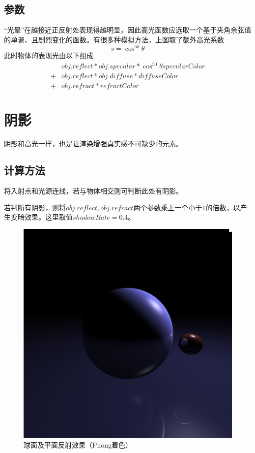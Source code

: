 \documentclass[10pt,twocolumn]{article}
\begin{document}
\subsection{\hei 参数}
“光晕”在越接近正反射处表现得越明显，因此高光函数应选取一个基于夹角余弦值的单调、且剧烈变化的函数。有很多种模拟方法，上图取了额外高光系数
\begin{equation}
s=\cos^{50}{\theta}
\end{equation}
此时物体的表现光由以下组成
\begin{align*}
 &obj.reflect * obj.specular *\cos^{50}{\theta}specularColor\\
 +&obj.reflect * obj.diffuse * diffuseColor\\
 +&obj.refract * refractColor
\end{align*}

\section{\hei 阴影}
阴影和高光一样，也是让渲染增强真实感不可缺少的元素。
\subsection{\hei 计算方法}
将入射点和光源连线，若与物体相交则可判断此处有阴影。

若判断有阴影，则将$obj.reflect,obj.refract$两个参数乘上一个小于$1$的倍数，以产生变暗效果。这里取值$shadowRate=0.4$。

\newpage
\begin{figure}[ht]
\centering
\includegraphics[scale=.2]{fig4.jpg}
\caption{球面及平面反射效果（Phong着色）}
\end{figure}
\end{document}
